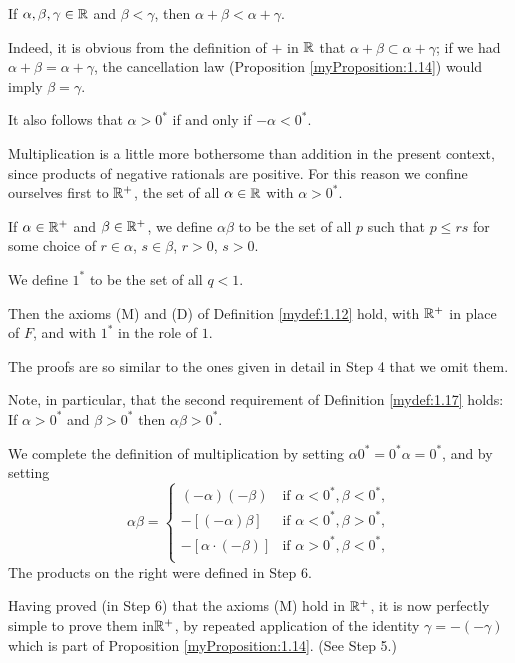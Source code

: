 If $\alpha, \beta, \gamma \in {\protect\mathbb R}$ and $\beta < \gamma$, then $\alpha + \beta < \alpha + \gamma$.

Indeed, it is obvious from the definition of $+$ in ${\protect\mathbb R}$ that $\alpha + \beta \subset \alpha + \gamma$; 
if we had $\alpha + \beta = \alpha + \gamma$, 
the cancellation law (Proposition \ref{myProposition:1.14}) would imply $\beta = \gamma$.

It also follows that $\alpha > 0^*$ if and only if $-\alpha < 0^*$.

Multiplication is a little more bothersome than addition in the present context, 
since products of negative rationals are positive. 
For this reason we confine ourselves first to ${\protect\mathbb R}^+$, 
the set of all $\alpha \in {\protect\mathbb R}$ with $\alpha > 0^*$.

If $\alpha \in {\protect\mathbb R}^+$ and $\beta \in {\protect\mathbb R}^+$, 
we define $\alpha\beta$ to be the set of all $p$ such that $p \leq rs$
for some choice of $r \in \alpha$, $s \in \beta$, $r>0$, $s>0$.

We define $1^*$ to be the set of all $q < 1$.

Then the axioms (M) and (D) of Definition \ref{mydef:1.12} hold, 
with ${\protect\mathbb R}^+$ in place of $F$, and with $1^*$ in the role of $1$.

The proofs are so similar to the ones given in detail in Step 4 that we omit them.

Note, in particular, that the second requirement of Definition \ref{mydef:1.17} holds:
If $\alpha > 0^*$ and $\beta > 0^*$ then $\alpha\beta > 0^*$.

We complete the definition of multiplication 
by setting $\alpha 0^* = 0^* \alpha = 0^*$,
and by setting
\begin{equation*}
    \alpha\beta = \left\{
        \begin{array}{ll}
            (-\alpha)(-\beta) & \text{if } \alpha < 0^*, \beta < 0^*,\\
            -[(-\alpha)\beta] & \text{if } \alpha < 0^*, \beta > 0^*,\\
            -[\alpha\cdot(-\beta)] & \text{if } \alpha > 0^*, \beta < 0^*,\\
        \end{array}
    \right.
\end{equation*}
The products on the right were defined in Step 6.

Having proved (in Step 6) that the axioms (M) hold in ${\protect\mathbb R}^+$, 
it is now perfectly simple to prove them in${\protect\mathbb R}^+$, 
by repeated application of the identity $\gamma = -(-\gamma)$ 
which is part of Proposition \ref{myProposition:1.14}. (See Step 5.)

